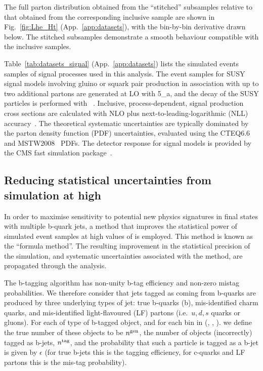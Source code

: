 The full parton \scalht distribution obtained from the ``stitched''
subsamples relative to that obtained from the corresponding inclusive
sample are shown in Fig.~\ref{fig:Lhe_Ht} (App.~\ref{app:datasets}),
with the bin-by-bin derivative drawn below. The stitched subsamples
demonstrate a smooth behaviour compatible with the inclusive samples.

Table~\ref{tab:datasets_signal} (App.~\ref{app:datasets}) lists the
simulated events samples of signal processes used in this
analysis. The event samples for SUSY signal models involving gluino or
squark pair production in association with up to two additional
partons are generated at LO with {\MADGRAPH{}5\_a\MCATNLO}, and the
decay of the SUSY particles is performed with ~\cite{pythia}. Inclusive, process-dependent, signal production
cross sections are calculated with NLO plus
next-to-leading-logarithmic (NLL) accuracy~\cite{Beenakker:1996ch,
  PhysRevLett.102.111802, PhysRevD.80.095004, 1126-6708-2009-12-041,
  doi:10.1142/S0217751X11053560, susynlo}. The theoretical systematic
uncertainties are typically dominated by the parton density function
(PDF) uncertainties, evaluated using the
CTEQ6.6~\cite{Nadolsky:2008zw} and MSTW2008~\cite{Martin:2009iq} PDFs.
The detector response for signal models is provided by the CMS fast
simulation package~\cite{fastsim}.

\subsection{Reducing statistical uncertainties from simulation at high \texorpdfstring{\nb}{Nb}}
\label{sec:formula}

In order to maximise sensitivity to potential new physics signatures
in final states with multiple b-quark jets, a method that improves the
statistical power of simulated event samples at high values of \nb is
employed. This method is known as the ``formula method''. The
resulting improvement in the statistical precision of the simulation,
and systematic uncertainties associated with the method, are
propagated through the analysis.

The b-tagging algorithm has non-unity b-tag efficiency and non-zero mistag probabilities.
We therefore consider that jets tagged as coming from b-quarks are produced by
three underlying types of jet: true b-quarks (b), mis-identified charm quarks,
and mis-identified light-flavoured (LF) partons (i.e.\ $u,d,s$ quarks or gluons).
For each of type of b-tagged object, and for each bin in (\njet , \scalht, \mht).  
we define the true number of these objects
to be $n^{\rm gen}$, the number of objects (incorrectly) tagged as b-jets, 
$n^{\rm tag}$, and the probability that such a particle is tagged as a b-jet
is given by $\epsilon$ (for true b-jets this is the tagging efficiency, for 
c-quarks and LF partons this is the mis-tag probability).

